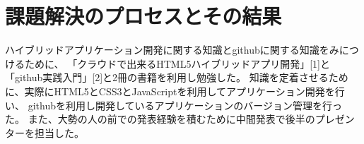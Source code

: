 \section{課題解決のプロセスとその結果}
ハイブリッドアプリケーション開発に関する知識とgithubに関する知識をみにつけるために、
「クラウドで出来るHTML5ハイブリッドアプリ開発」[1]と「github実践入門」[2]と2冊の書籍を利用し勉強した。
知識を定着させるために、実際にHTML5とCSS3とJavaScriptを利用してアプリケーション開発を行い、
githubを利用し開発しているアプリケーションのバージョン管理を行った。
また、大勢の人の前での発表経験を積むために中間発表で後半のプレゼンターを担当した。
